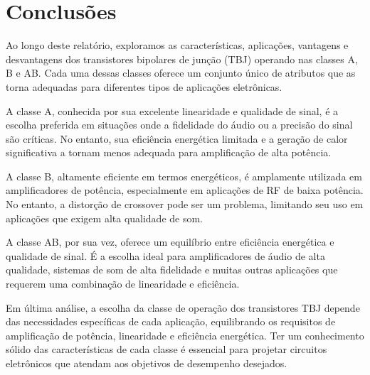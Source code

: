 \section{Conclusões}

Ao longo deste relatório, exploramos as características, aplicações, vantagens e desvantagens dos transistores bipolares de junção (TBJ) operando nas classes A, B e AB. Cada uma dessas classes oferece um conjunto único de atributos que as torna adequadas para diferentes tipos de aplicações eletrônicas.

A classe A, conhecida por sua excelente linearidade e qualidade de sinal, é a escolha preferida em situações onde a fidelidade do áudio ou a precisão do sinal são críticas. No entanto, sua eficiência energética limitada e a geração de calor significativa a tornam menos adequada para amplificação de alta potência.

A classe B, altamente eficiente em termos energéticos, é amplamente utilizada em amplificadores de potência, especialmente em aplicações de RF de baixa potência. No entanto, a distorção de crossover pode ser um problema, limitando seu uso em aplicações que exigem alta qualidade de som.

A classe AB, por sua vez, oferece um equilíbrio entre eficiência energética e qualidade de sinal. É a escolha ideal para amplificadores de áudio de alta qualidade, sistemas de som de alta fidelidade e muitas outras aplicações que requerem uma combinação de linearidade e eficiência.

Em última análise, a escolha da classe de operação dos transistores TBJ depende das necessidades específicas de cada aplicação, equilibrando os requisitos de amplificação de potência, linearidade e eficiência energética. Ter um conhecimento sólido das características de cada classe é essencial para projetar circuitos eletrônicos que atendam aos objetivos de desempenho desejados.
